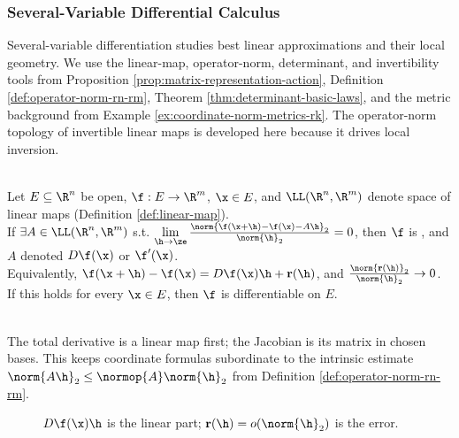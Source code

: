 \subsubsection{Several-Variable Differential Calculus}

Several-variable differentiation studies best linear approximations and their local geometry. We use the linear-map, operator-norm, determinant, and invertibility tools from Proposition \ref{prop:matrix-representation-action}, Definition \ref{def:operator-norm-rn-rm}, Theorem \ref{thm:determinant-basic-laws}, and the metric background from Example \ref{ex:coordinate-norm-metrics-rk}. The operator-norm topology of invertible linear maps is developed here because it drives local inversion.

\begin{definition} \label{def:several-variable-differentiation-core-source-todo}\label{def:total-derivative-rn-rm} \\
Let $E\subseteq\R^n$ be open, $\f:E\to\R^m$, $\x\in E$, and $\LL(\R^n,\R^m)$ denote space of linear maps (Definition \ref{def:linear-map}).\\
If $\exists A\in\LL(\R^n,\R^m)$ s.t. $\lim\limits_{\h\to\ze}\frac{\norm{\f(\x+\h)-\f(\x)-A\h}_2}{\norm{\h}_2}=0$, then $\f$ is , and $A$ denoted $D\f(\x)$ or $\f'(\x)$.\\
Equivalently, $\f(\x+\h)-\f(\x)=D\f(\x)\h+\mathbf{r}(\h)$, and $\frac{\norm{\mathbf{r}(\h)}_2}{\norm{\h}_2}\to0$.\\
If this holds for every $\x\in E$, then $\f$ is differentiable on $E$.
\end{definition}

\begin{perspective} \label{per:total-derivative-linear-map-first} \\
The total derivative is a linear map first; the Jacobian is its matrix in chosen bases. This keeps coordinate formulas subordinate to the intrinsic estimate $\norm{A\h}_2\leq\normop{A}\norm{\h}_2$ from Definition \ref{def:operator-norm-rn-rm}.
\end{perspective}

\begin{figure}[H]
  \centering
  
  \caption{$D\f(\x)\h$ is the linear part; $\mathbf{r}(\h)=o(\norm{\h}_2)$ is the error.}
  \label{fig:total-derivative-linear-approximation}
\end{figure}

